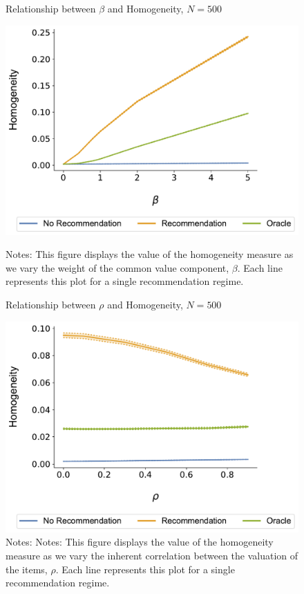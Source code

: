 \documentclass[format=acmsmall, review=true]{acmart}
\begin{document}
\begin{figure}[ht]
\caption{Relationship between $\beta$ and Homogeneity, $N = 500$}
\includegraphics[width=.45\linewidth]{figures/beta_homogeneity_N_500_T_20}\label{fig:beta_homo}
\caption*{\scriptsize Notes: This figure displays the value of the homogeneity measure as we vary the weight of the common value component, $\beta$. Each line represents this plot for a single recommendation regime.}
\end{figure}
\begin{figure}[ht]
\caption{Relationship between $\rho$ and Homogeneity, $N = 500$}
\includegraphics[width=.45\linewidth]{figures/rho_homogeneity_N_500_T_20}
\caption*{\scriptsize Notes: Notes: This figure displays the value of the homogeneity measure as we vary the inherent correlation between the valuation of the items, $\rho$. Each line represents this plot for a single recommendation regime.}\label{fig:cor_homo}
\end{figure}
\end{document}

